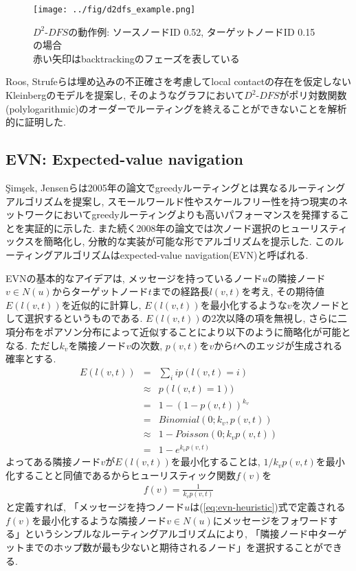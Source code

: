 \documentclass[dvipdfmx]{ampbt}
\begin{document}
   \begin{figure}[htbp]
    \centerline{\texttt{[image: ../fig/d2dfs\_example.png]}}
    \caption{$D^2$-$DFS$の動作例: ソースノードID 0.52, ターゲットノードID 0.15の場合 \\ 赤い矢印はbacktrackingのフェーズを表している}
    \label{fig:d2dfs_example}
   \end{figure}

   Roos, Strufeらは埋め込みの不正確さを考慮してlocal contactの存在を仮定しないKleinbergのモデルを提案し, そのようなグラフにおいて$D^2$-$DFS$がポリ対数関数(polylogarithmic)のオーダーでルーティングを終えることができないことを解析的に証明した\cite{roos2016dealing}. 

   \subsection{EVN: Expected-value navigation} \label{sec:evn}
   {\c{S}}im{\c{s}}ek, Jensenらは2005年の論文でgreedyルーティングとは異なるルーティングアルゴリズムを提案し, スモールワールド性やスケールフリー性を持つ現実のネットワークにおいてgreedyルーティングよりも高いパフォーマンスを発揮することを実証的に示した\cite{simsek2005decentralized}. また続く2008年の論文では次ノード選択のヒューリスティックスを簡略化し, 分散的な実装が可能な形でアルゴリズムを提示した\cite{simsek2008navigating}. このルーティングアルゴリズムはexpected-value navigation(EVN)と呼ばれる.

   EVNの基本的なアイデアは, メッセージを持っているノード$u$の隣接ノード$v \in N(u)$からターゲットノード$t$までの経路長$l(v,t)$を考え, その期待値$E(l(v,t))$を近似的に計算し, $E(l(v,t))$を最小化するような$v$を次ノードとして選択するというものである. $E(l(v,t))$の2次以降の項を無視し, さらに二項分布をポアソン分布によって近似することにより以下のように簡略化が可能となる. ただし$k_v$を隣接ノード$v$の次数, $p(v,t)$を$v$から$t$へのエッジが生成される確率とする.
    \begin{eqnarray}
     E(l(v,t)) &=& \sum_i ip(l(v,t)=i)\nonumber \\
     &\approx& p(l(v,t)=1)  )\nonumber\\
     &=& 1- (1 - p(v,t))^{k_v} \nonumber\\
     &=& Binomial(0;  k_v, p(v,t)) \nonumber \\
     &\approx& 1 - Poisson(0; k_vp(v,t)) \nonumber\\
     &=& 1- e^{k_vp(v,t)} \label{eq:evn-basic}
    \end{eqnarray}
    よってある隣接ノード$v$が$E(l(v,t))$を最小化することは, $1/k_vp(v,t)$を最小化することと同値であるからヒューリスティック関数$f(v)$を
    \begin{eqnarray}
     f(v) = \frac{1}{k_vp(v,t)}\label{eq:evn-heuristic}
    \end{eqnarray}
    と定義すれば, 「メッセージを持つノード$u$は(\ref{eq:evn-heuristic})式で定義される$f(v)$を最小化するような隣接ノード$v \in N(u)$にメッセージをフォワードする」というシンプルなルーティングアルゴリズムにより, 「隣接ノード中ターゲットまでのホップ数が最も少ないと期待されるノード」を選択することができる.
\end{document}
